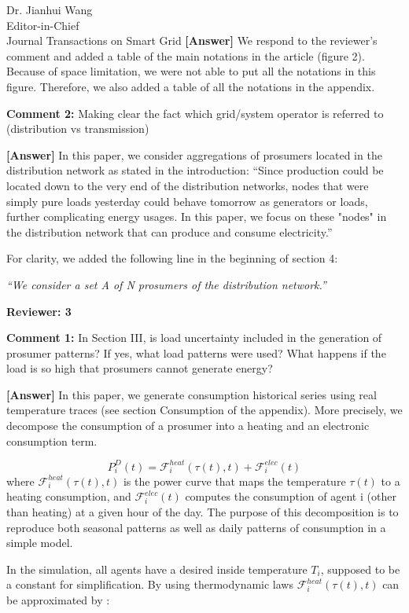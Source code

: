 \documentclass{letter}
\begin{document}
\begin{letter}{Dr. Jianhui Wang \\ Editor-in-Chief \\ Journal Transactions on Smart Grid }
\textbf{[Answer]} We respond to the reviewer’s comment and added a table of the main notations in the article (figure 2). Because of space limitation, we were not able to put all the notations in this figure. Therefore, we also added a table of all the notations in the appendix.


\textbf{Comment 2:} Making clear the fact which grid/system operator is referred to (distribution vs transmission)

\textbf{[Answer]} In this paper, we consider aggregations of prosumers located in the distribution network as stated in the introduction:
“Since production could be located down to the very end of the distribution networks, nodes that were simply pure loads yesterday could behave tomorrow as generators or loads, further complicating energy usages. In this paper, we focus on these "nodes" in the distribution network that can produce and consume electricity.”

For clarity, we added the following line in the beginning of section 4:

\textit{“We consider a set A of N prosumers of the distribution network.”}


\textbf{Reviewer: 3}

\textbf{Comment 1:} In Section III, is load uncertainty included in the generation of prosumer patterns? If yes, what load patterns were used? What happens if the load is so high that prosumers cannot generate energy?


\textbf{[Answer]} In this paper, we generate consumption historical series using real temperature traces (see section Consumption of the appendix). More precisely, we decompose the consumption of a prosumer into a heating and an electronic consumption term.

\begin{equation}
P_{i}^{D}(t) = \mathcal{F}_{i}^{heat}(\tau(t), t) + \mathcal{F}_{i}^{elec}(t)
\end{equation}
where $ \mathcal{F}_{i}^{heat}(\tau(t), t) $ is the power curve that maps the temperature $ \tau(t) $ to a heating consumption, and $ \mathcal{F}_{i}^{elec}(t) $ computes the consumption of agent i (other than heating) at a given hour of the day. The purpose of this decomposition is to reproduce both seasonal patterns as well as daily patterns of consumption in a simple model.

In the simulation, all agents have a desired inside temperature $ T_{i} $, supposed to be a constant for simplification. By using thermodynamic laws $ \mathcal{F}_{i}^{heat}(\tau(t), t) $ can be approximated by :


\end{letter}
\end{document}

